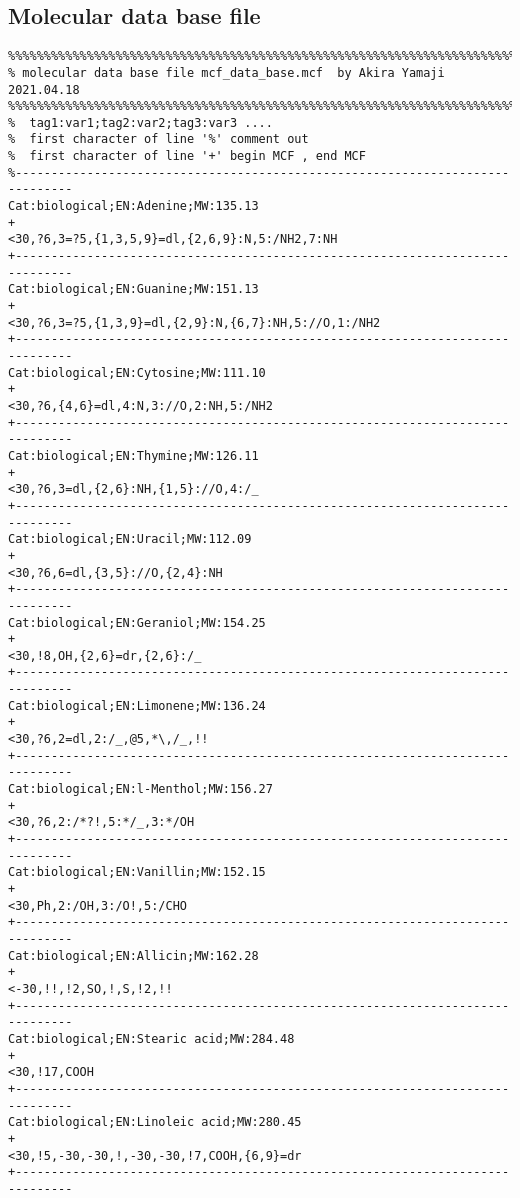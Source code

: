 \documentclass[a4paper]{article}
\begin{document}
\subsection{Molecular data base file}
\begin{verbatim}
%%%%%%%%%%%%%%%%%%%%%%%%%%%%%%%%%%%%%%%%%%%%%%%%%%%%%%%%%%%%%%%%%%%%%%%%%%%%%%%
% molecular data base file mcf_data_base.mcf  by Akira Yamaji  2021.04.18
%%%%%%%%%%%%%%%%%%%%%%%%%%%%%%%%%%%%%%%%%%%%%%%%%%%%%%%%%%%%%%%%%%%%%%%%%%%%%%%
%  tag1:var1;tag2:var2;tag3:var3 ....
%  first character of line '%' comment out
%  first character of line '+' begin MCF , end MCF
%------------------------------------------------------------------------------
Cat:biological;EN:Adenine;MW:135.13
+
<30,?6,3=?5,{1,3,5,9}=dl,{2,6,9}:N,5:/NH2,7:NH
+------------------------------------------------------------------------------
Cat:biological;EN:Guanine;MW:151.13
+
<30,?6,3=?5,{1,3,9}=dl,{2,9}:N,{6,7}:NH,5://O,1:/NH2
+------------------------------------------------------------------------------
Cat:biological;EN:Cytosine;MW:111.10
+
<30,?6,{4,6}=dl,4:N,3://O,2:NH,5:/NH2
+------------------------------------------------------------------------------
Cat:biological;EN:Thymine;MW:126.11
+
<30,?6,3=dl,{2,6}:NH,{1,5}://O,4:/_
+------------------------------------------------------------------------------
Cat:biological;EN:Uracil;MW:112.09
+
<30,?6,6=dl,{3,5}://O,{2,4}:NH
+------------------------------------------------------------------------------
Cat:biological;EN:Geraniol;MW:154.25
+
<30,!8,OH,{2,6}=dr,{2,6}:/_
+------------------------------------------------------------------------------
Cat:biological;EN:Limonene;MW:136.24
+
<30,?6,2=dl,2:/_,@5,*\,/_,!!
+------------------------------------------------------------------------------
Cat:biological;EN:l-Menthol;MW:156.27
+
<30,?6,2:/*?!,5:*/_,3:*/OH
+------------------------------------------------------------------------------
Cat:biological;EN:Vanillin;MW:152.15
+
<30,Ph,2:/OH,3:/O!,5:/CHO
+------------------------------------------------------------------------------
Cat:biological;EN:Allicin;MW:162.28
+
<-30,!!,!2,SO,!,S,!2,!!
+------------------------------------------------------------------------------
Cat:biological;EN:Stearic acid;MW:284.48
+
<30,!17,COOH
+------------------------------------------------------------------------------
Cat:biological;EN:Linoleic acid;MW:280.45
+
<30,!5,-30,-30,!,-30,-30,!7,COOH,{6,9}=dr
+------------------------------------------------------------------------------
\end{verbatim}
\noindent%
\newpage
\end{document}
